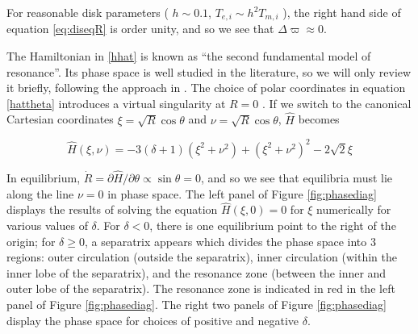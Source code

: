 \documentclass{mnras}
\renewcommand{\d}{\partial}
\begin{document}
For reasonable disk parameters ( \(h\sim 0.1\), \(T_{e,i}\sim h^2
T_{m,i}\) ), the right hand side of equation \eqref{eq:diseqR}
is order unity, and so we see that \(\Delta\varpi\approx 0\).


The Hamiltonian in \eqref{hhat} is known as ``the second fundamental
model of resonance''. Its phase space is well studied in the
literature, so we will only review it briefly, following the approach
in \cite{henrard_second_1983}.  The choice of polar coordinates in
equation \eqref{hattheta} introduces a virtual singularity at \(R=0\)
\cite{henrard_second_1983}.  If we switch to the canonical Cartesian
coordinates \(\xi = \sqrt{R}\cos\theta\) and \(\nu = \sqrt{R}\cos\theta\),
\(\hat H\) becomes

\begin{equation}
  \hat H(\xi,\nu) = -3(\delta+1)(\xi^2+\nu^2) + (\xi^2+\nu^2)^2 -2\sqrt2
  \xi
\end{equation}

In equilibrium, \(\dot R = \d\hat H/\d\theta \propto \sin\theta= 0\),
and so we see that equilibria must lie along the line \(\nu=0\) in phase
space.  The left panel of Figure \ref{fig:phasediag} displays the
results of solving the equation \(\hat H(\xi, 0) = 0\) for \(\xi\)
numerically for various values of \(\delta\).  For \(\delta<0\), there is
one equilibrium point to the right of the origin; for \(\delta \geq 0\),
a separatrix appears which divides the phase space into 3 regions:
outer circulation (outside the separatrix), inner circulation (within
the inner lobe of the separatrix), and the resonance zone (between the
inner and outer lobe of the separatrix).  The resonance zone is
indicated in red in the left panel of Figure \ref{fig:phasediag}.  The
right two panels of Figure \ref{fig:phasediag} display the phase space
for choices of positive and negative \(\delta\).
\end{document}
